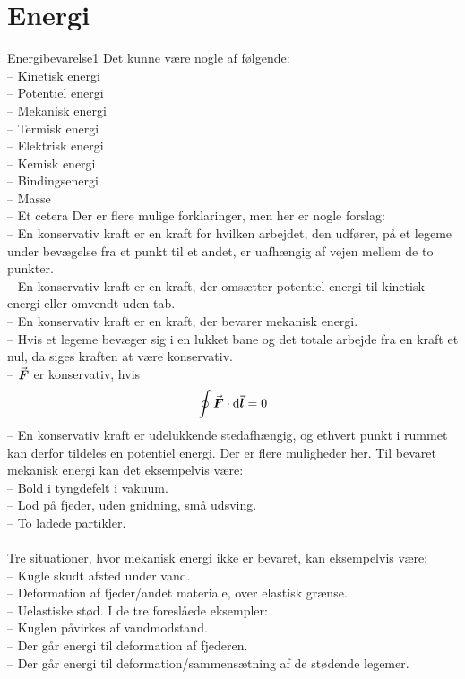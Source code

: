 \section*{Energi}
%
%
\begin{opgave}{Energibevarelse}{1}
\opg Det kunne være nogle af følgende: \\
-- \: Kinetisk energi \\
-- \: Potentiel energi \\
-- \: Mekanisk energi \\
-- \: Termisk energi \\
-- \: Elektrisk energi \\
-- \: Kemisk energi \\
-- \: Bindingsenergi \\
-- \: Masse \\
-- \: Et cetera
\opg Der er flere mulige forklaringer, men her er nogle forslag: \\
-- \: En konservativ kraft er en kraft for hvilken arbejdet, den udfører, på et legeme under bevægelse fra et punkt til et andet, er uafhængig af vejen mellem de to punkter. \\
-- \: En konservativ kraft er en kraft, der omsætter potentiel energi til kinetisk energi eller omvendt uden tab. \\
-- \: En konservativ kraft er en kraft, der bevarer mekanisk energi. \\
-- \: Hvis et legeme bevæger sig i en lukket bane og det totale arbejde fra en kraft et nul, da siges kraften at være konservativ.\\ 
-- \: ${\vec{\boldsymbol{F}}}$ er konservativ, hvis
\begin{align*}
	\oint{\vec{\boldsymbol{F}}}\cdot\mathrm{d}{\vec{\boldsymbol{l}}} = 0
\end{align*}
-- \: En konservativ kraft er udelukkende stedafhængig, og ethvert punkt i rummet kan derfor tildeles en potentiel energi.
\opg Der er flere muligheder her. Til bevaret mekanisk energi kan det eksempelvis være: \\
-- \: Bold i tyngdefelt i vakuum. \\
-- \: Lod på fjeder, uden gnidning, små udsving. \\
-- \: To ladede partikler. \\ \\
Tre situationer, hvor mekanisk energi ikke er bevaret, kan eksempelvis være: \\
-- \: Kugle skudt afsted under vand. \\
-- \: Deformation af fjeder/andet materiale, over elastisk grænse. \\
-- \: Uelastiske stød.
\opg I de tre foreslåede eksempler: \\
-- \: Kuglen påvirkes af vandmodstand. \\
-- \: Der går energi til deformation af fjederen. \\
-- \: Der går energi til deformation/sammensætning af de stødende legemer.
\end{opgave}
